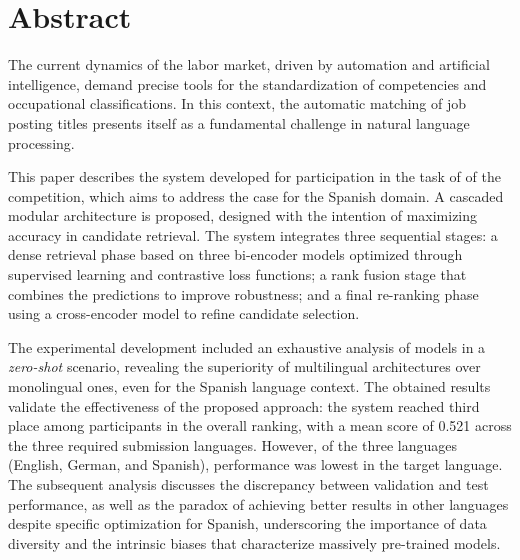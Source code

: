 \chapter*{Abstract}
\label{sec:Abstract}

\noindent The current dynamics of the labor market, driven by automation and artificial intelligence, demand precise tools for the standardization of competencies and occupational classifications. In this context, the automatic matching of job posting titles presents itself as a fundamental challenge in natural language processing.

This paper describes the system developed for participation in the task of  of the  competition, which aims to address the case for the Spanish domain. A cascaded modular architecture is proposed, designed with the intention of maximizing accuracy in candidate retrieval. The system integrates three sequential stages: a dense retrieval phase based on three bi-encoder models optimized through supervised learning and contrastive loss functions; a rank fusion stage that combines the predictions to improve robustness; and a final re-ranking phase using a cross-encoder model to refine candidate selection.

The experimental development included an exhaustive analysis of models in a \textit{zero-shot} scenario, revealing the superiority of multilingual architectures over monolingual ones, even for the Spanish language context. The obtained results validate the effectiveness of the proposed approach: the system reached third place among participants in the overall ranking, with a mean  score of 0.521 across the three required submission languages. However, of the three languages (English, German, and Spanish), performance was lowest in the target language. The subsequent analysis discusses the discrepancy between validation and test performance, as well as the paradox of achieving better results in other languages despite specific optimization for Spanish, underscoring the importance of data diversity and the intrinsic biases that characterize massively pre-trained models.

